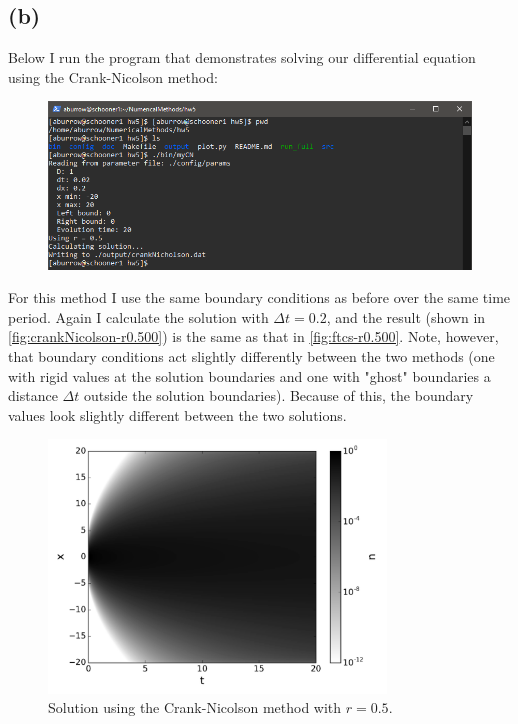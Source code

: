 \documentclass[12pt]{article}
\begin{document}
\subsection*{(b)}

Below I run the program that demonstrates solving our differential equation
using the Crank-Nicolson method:
\begin{figure}[H]
    \centering
    \includegraphics[width=1\textwidth]{myCN}
    \label{fig:myCN}
\end{figure}

For this method I use the same boundary conditions as before over the same time
period. Again I calculate the solution with $\Delta t = 0.2$, and the result
(shown in \autoref{fig:crankNicolson-r0.500}) is the same as that in
\autoref{fig:ftcs-r0.500}. Note, however, that boundary conditions act
slightly differently between the two methods (one with rigid values at the
solution boundaries and one with "ghost" boundaries a distance $\Delta t$
outside the solution boundaries). Because of this, the boundary values look
slightly different between the two solutions.

\begin{figure}[ht]
    \centering
    \includegraphics[width=0.8\textwidth]{crankNicolson-r0.500}
    \caption{Solution using the Crank-Nicolson method with $r = 0.5$.}
    \label{fig:crankNicolson-r0.500}
\end{figure}
\end{document}
